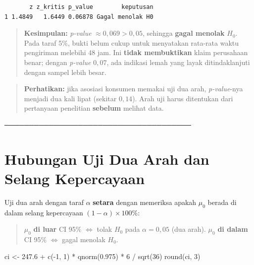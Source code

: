 \documentclass[
  indonesian,
  letterpaper,
]{book}
\newenvironment{Shaded}{\begin{snugshade}}{\end{snugshade}}
\newcommand{\DecValTok}[1]{\textcolor[rgb]{0.68,0.00,0.00}{#1}}
\newcommand{\FloatTok}[1]{\textcolor[rgb]{0.68,0.00,0.00}{#1}}
\newcommand{\FunctionTok}[1]{\textcolor[rgb]{0.28,0.35,0.67}{#1}}
\newcommand{\NormalTok}[1]{\textcolor[rgb]{0.00,0.23,0.31}{#1}}
\newcommand{\OtherTok}[1]{\textcolor[rgb]{0.00,0.23,0.31}{#1}}
\newcommand{\SpecialCharTok}[1]{\textcolor[rgb]{0.37,0.37,0.37}{#1}}
\begin{document}
\begin{verbatim}
       z z_kritis p_value        keputusan
1 1.4849   1.6449 0.06878 Gagal menolak H0
\end{verbatim}

\begin{quote}
\textbf{Kesimpulan:} \emph{p-value} \(\approx 0{,}069 > 0{,}05\),
sehingga \textbf{gagal menolak} \(H_0\). Pada taraf 5\%, bukti belum
cukup untuk menyatakan rata-rata waktu pengiriman melebihi 48 jam. Ini
\textbf{tidak membuktikan} klaim perusahaan benar; dengan \emph{p-value}
\(0{,}07\), ada indikasi lemah yang layak ditindaklanjuti dengan sampel
lebih besar.
\end{quote}

\begin{quote}
\textbf{Perhatikan:} jika asosiasi konsumen memakai uji dua arah,
\emph{p-value}-nya menjadi dua kali lipat (sekitar \(0{,}14\)). Arah uji
harus ditentukan dari pertanyaan penelitian \textbf{sebelum} melihat
data.
\end{quote}

──────────────────────────────────────

\section{Hubungan Uji Dua Arah dan Selang
Kepercayaan}\label{hubungan-uji-dua-arah-dan-selang-kepercayaan}

Uji dua arah dengan taraf \(\alpha\) \textbf{setara} dengan memeriksa
apakah \(\mu_0\) berada di dalam selang kepercayaan
\((1-\alpha) \times 100\%\):

\begin{quote}
\(\mu_0\) \textbf{di luar} CI 95\% \(\iff\) tolak \(H_0\) pada
\(\alpha = 0{,}05\) (dua arah). \(\mu_0\) \textbf{di dalam} CI 95\%
\(\iff\) gagal menolak \(H_0\).
\end{quote}

\begin{Shaded}
\begin{Highlighting}[]
\NormalTok{ci }\OtherTok{\textless{}{-}} \FloatTok{247.6} \SpecialCharTok{+} \FunctionTok{c}\NormalTok{(}\SpecialCharTok{{-}}\DecValTok{1}\NormalTok{, }\DecValTok{1}\NormalTok{) }\SpecialCharTok{*} \FunctionTok{qnorm}\NormalTok{(}\FloatTok{0.975}\NormalTok{) }\SpecialCharTok{*} \DecValTok{6} \SpecialCharTok{/} \FunctionTok{sqrt}\NormalTok{(}\DecValTok{36}\NormalTok{)}
\FunctionTok{round}\NormalTok{(ci, }\DecValTok{3}\NormalTok{)}
\end{Highlighting}
\end{Shaded}
\end{document}
